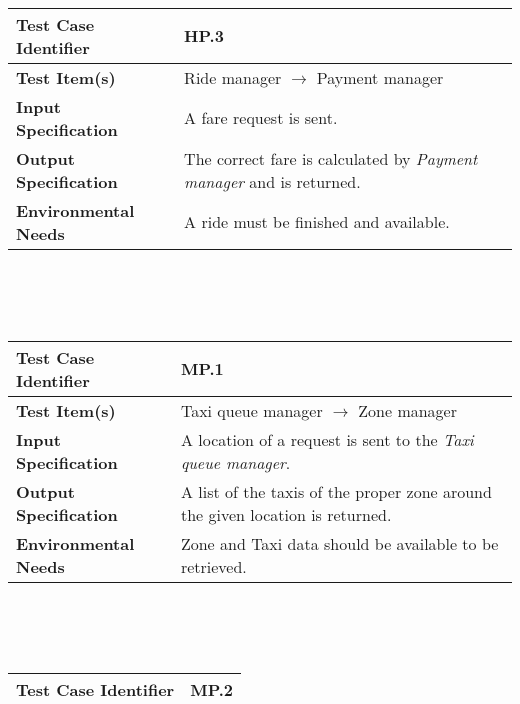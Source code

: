 {\begin{tabularx}{\textwidth}{l X}
\end{tabularx}
\\ \\ \\
\begin{tabularx}{\textwidth}{l X}
    \hline 
    \textbf{Test Case Identifier} & HP.3\\ 
    \hline 
    
    \textbf{Test Item(s)} & Ride manager $\rightarrow$ Payment manager\\
    \hline 
    
    \textbf{Input Specification} & A fare request is sent. \\
    \hline 
    
    \textbf{Output Specification} & The correct fare is calculated by \textit{Payment manager} and is returned. \\
    \hline 
    
    \textbf{Environmental Needs} & A ride must be finished and available.  \\
    \hline

\end{tabularx}
\\ \\ \\
\begin{tabularx}{\textwidth}{l X}
    \hline 
    \textbf{Test Case Identifier} & MP.1\\ 
    \hline 
    
    \textbf{Test Item(s)} & Taxi queue manager $\rightarrow$ Zone manager\\
    \hline 
    
    \textbf{Input Specification} & A location of a request is sent to the \textit{Taxi queue manager}. \\
    \hline 
    
    \textbf{Output Specification} & A list of the taxis of the proper zone around the given location is returned. \\
    \hline 
    
    \textbf{Environmental Needs} & Zone and Taxi data should be available to be retrieved. \\
    \hline

\end{tabularx}
\\ \\ \\
\begin{tabularx}{\textwidth}{l X}
    \hline 
    \textbf{Test Case Identifier} & MP.2\\ 
    \hline 
    

\end{tabularx}}
